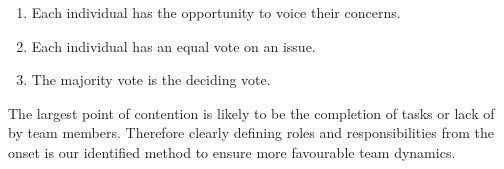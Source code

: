 \documentclass[11pt,a4paper]{article}
\begin{document}
\begin{enumerate}[itemsep=-1ex]
  \item Each individual has the opportunity to voice their concerns.
  \item Each individual has an equal vote on an issue.
  \item The majority vote is the deciding vote.
\end{enumerate}

The largest point of contention is likely to be the completion of tasks or lack of by team members.  Therefore clearly defining roles and responsibilities from the onset is our identified method to ensure more favourable team dynamics.
\end{document}
